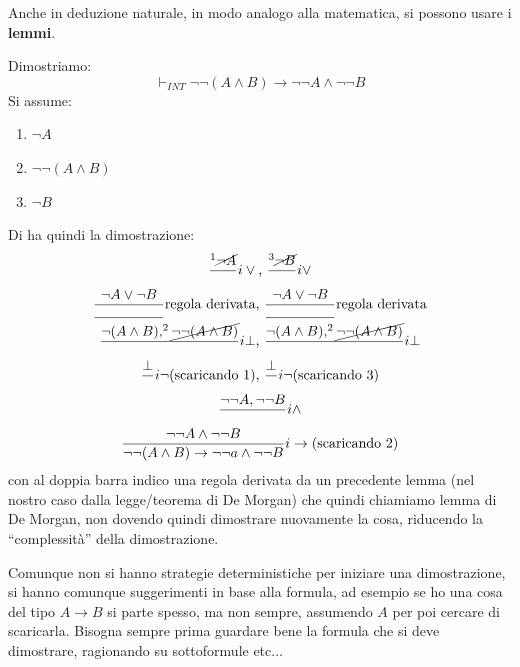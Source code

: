 \documentclass[a4paper,12pt, oneside]{book}
\begin{document}
Anche in deduzione naturale, in modo analogo alla matematica, si possono usare i
\textbf{lemmi}.
\begin{esempio}
  Dimostriamo:
  \[\vdash_{INT}\neg\neg (A\land B)\to \neg\neg A\land \neg \neg B\]
  Si assume:
  \begin{enumerate}
    \item $\neg A$
    \item $\neg\neg(A\land B)$
    \item $\neg B$
  \end{enumerate}
  Di ha quindi la dimostrazione:
  \begin{gather*}
    \frac{^1 \cancel{\neg A}}{}i\lor \mbox{, }
    \frac{^3 \cancel{\neg B}}{}i\lor\\
    \frac{\neg A\lor \neg B}{\rule{49pt}{0.4pt}}\mbox{regola derivata, }
    \frac{\neg A\lor \neg B}{\rule{49pt}{0.4pt}}\mbox{regola derivata}\\
    \frac{\neg (A\land B),^2\cancel{\neg\neg(A\land B)}}{}i\bot\mbox{, }
    \frac{\neg  (A\land B),^2\cancel{\neg\neg(A\land B)}}{}i\bot\\ 
    \frac{\bot}{}i\neg\mbox{(scaricando 1), }
    \frac{\bot}{}i\neg\mbox{(scaricando 3)}\\ 
    \frac{\neg\neg A, \neg\neg B}{}i\land\\
    \frac{\neg\neg A\land \neg\neg B}{\neg\neg (A\land B)\to \neg\neg a\land
      \neg \neg B}i\to \mbox{(scaricando 2)}
  \end{gather*}
  con al doppia barra indico una regola derivata da un precedente lemma (nel
  nostro caso dalla legge/teorema di De Morgan) che quindi chiamiamo lemma di De
  Morgan, non dovendo quindi dimostrare nuovamente la cosa, riducendo la
  ``complessità'' della dimostrazione.
\end{esempio}
Comunque non si hanno strategie deterministiche per iniziare una dimostrazione,
si hanno comunque suggerimenti in base alla formula, ad esempio se ho una cosa
del tipo $A\to B$ si parte spesso, ma non sempre, assumendo $A$ per poi cercare
di scaricarla. Bisogna sempre prima guardare bene la formula che si deve
dimostrare, ragionando su sottoformule etc$\ldots$
\end{document}
